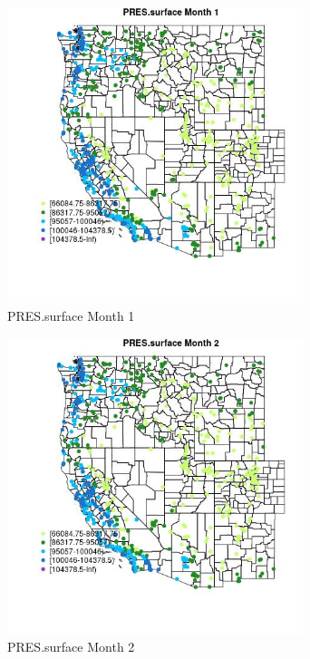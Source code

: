 \begin{figure} 
\centering  
\includegraphics[width=0.77\textwidth]{Code_Outputs/Report_ML_input_PM25_Step4_part_f_de_duplicated_aves_prioritize_24hr_obswNAs_MapObsMo1PRESsurface.jpg} 
\caption{\label{fig:Report_ML_input_PM25_Step4_part_f_de_duplicated_aves_prioritize_24hr_obswNAsMapObsMo1PRESsurface}PRES.surface Month 1} 
\end{figure} 
 

\begin{figure} 
\centering  
\includegraphics[width=0.77\textwidth]{Code_Outputs/Report_ML_input_PM25_Step4_part_f_de_duplicated_aves_prioritize_24hr_obswNAs_MapObsMo2PRESsurface.jpg} 
\caption{\label{fig:Report_ML_input_PM25_Step4_part_f_de_duplicated_aves_prioritize_24hr_obswNAsMapObsMo2PRESsurface}PRES.surface Month 2} 
\end{figure} 
 

